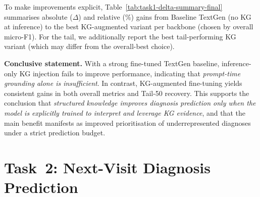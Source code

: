 To make improvements explicit, Table~\ref{tab:task1-delta-summary-final} summarises absolute ($\Delta$) and relative (\%) gains from Baseline TextGen (no KG at inference) to the best KG-augmented variant per backbone (chosen by overall micro-F1). For the tail, we additionally report the best tail-performing KG variant (which may differ from the overall-best choice).

\begin{table}[t]
\centering
\caption{Improvements from Baseline TextGen (no KG at inference) to best KG-augmented variant per backbone (selected by overall micro-F1). Tail improvements are reported for the best tail-performing KG variant. Relative gains shown as percent.}
\label{tab:task1-delta-summary-final}
\end{table}

\noindent\textbf{Conclusive statement.}
With a strong fine-tuned TextGen baseline, inference-only KG injection fails to improve performance, indicating that \emph{prompt-time grounding alone is insufficient}. In contrast, KG-augmented fine-tuning yields consistent gains in both overall metrics and Tail-50 recovery. This supports the conclusion that \emph{structured knowledge improves diagnosis prediction only when the model is explicitly trained to interpret and leverage KG evidence}, and that the main benefit manifests as improved prioritisation of underrepresented diagnoses under a strict prediction budget.


\section{Task~2: Next-Visit Diagnosis Prediction}
\label{sec:results-task2}

